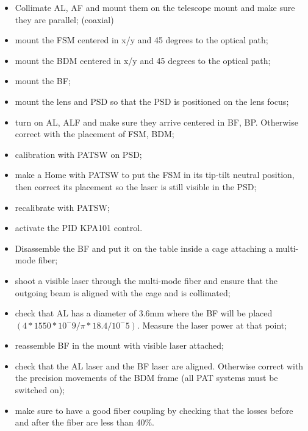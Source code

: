 \begin{itemize}
  \item Collimate AL, AF and mount them on the telescope mount and make sure they are parallel; (coaxial)
  \item mount the FSM centered in x/y and 45 degrees to the optical path;
  \item mount the BDM centered in x/y and 45 degrees to the optical path;
  \item mount the BF;
  \item mount the lens and PSD so that the PSD is positioned on the lens focus;
  \item turn on AL, ALF and make sure they arrive centered in BF, BP. Otherwise correct with the placement of FSM, BDM;
  \item calibration with PATSW on PSD;
  \item make a Home with PATSW to put the FSM in its tip-tilt neutral position, then correct its placement so the laser is still visible in the PSD;
  \item recalibrate with PATSW;
  \item activate the PID KPA101 control.
\end{itemize}

\begin{itemize}
  \item Disassemble the BF and put it on the table inside a cage attaching a multi-mode fiber;
  \item shoot a visible laser through the multi-mode fiber and ensure that the outgoing beam is aligned with the cage and is collimated;
  \item check that AL has a diameter of 3.6mm where the BF will be placed $(4 * 1550 * 10^-9 / \pi * 18.4 / 10^-5)$. Measure the laser power at that point;
  \item reassemble BF in the mount with visible laser attached;
  \item check that the AL laser and the BF laser are aligned. Otherwise correct with the precision movements of the BDM frame (all PAT systems must be switched on);
  \item make sure to have a good fiber coupling by checking that the losses before and after the fiber are less than 40\%.
\end{itemize}

